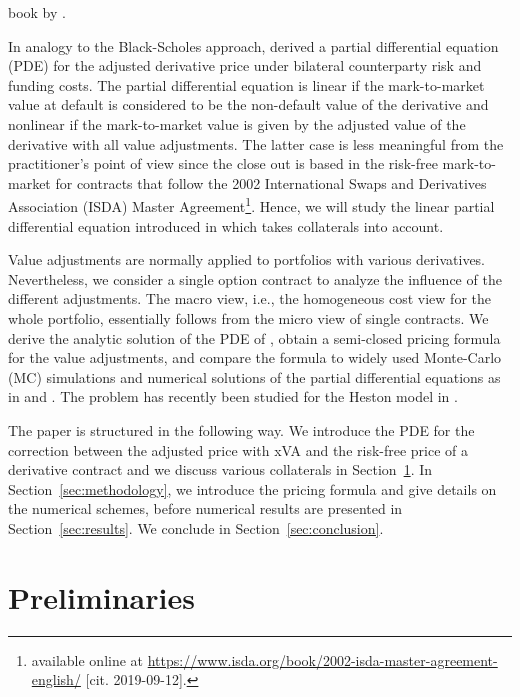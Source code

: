 \documentclass[a4paper,10pt]{article}
\newcommand{\1}{\mathbf{1}}
\begin{document}
book by \cite{Gregory2020}.

In analogy to the Black-Scholes approach, \cite{BurgardKjaer11PDE} derived a partial differential equation (PDE) for the adjusted derivative price under bilateral counterparty risk and funding costs. The partial differential equation is linear if the mark-to-market value at default is considered to be the non-default value of the derivative and nonlinear if the mark-to-market value is given by the adjusted value of the derivative with all value adjustments. The latter case is less meaningful from the practitioner's point of view since the close out is based in the risk-free mark-to-market for contracts that follow the 2002 International Swaps and Derivatives Association (ISDA) Master Agreement\footnote{available online at \url{https://www.isda.org/book/2002-isda-master-agreement-english/} [cit. 2019-09-12].}. Hence, we will study the linear partial differential equation introduced in \cite{BurgardKjaer13} which takes collaterals into account.

Value adjustments are normally applied to portfolios with various derivatives. Nevertheless, we consider a single option contract to analyze the influence of the different adjustments. The macro view, i.e., the homogeneous cost view for the whole portfolio, essentially follows from the micro view of single contracts. We derive the analytic solution of the PDE of \cite{BurgardKjaer13}, obtain a semi-closed pricing formula for the value adjustments, and compare the formula to widely used Monte-Carlo (MC) simulations and numerical solutions of the partial differential equations as in \cite{Arregui17} and \cite{Arregui18}. The problem has recently been studied for the Heston model in \cite{SalvadorOosterlee21}.

The paper is structured in the following way. We introduce the PDE for the correction between the adjusted price with xVA and the risk-free price of a derivative contract and we discuss various collaterals in Section~\ref{sec:preliminaries}. In Section~\ref{sec:methodology}, we introduce the pricing formula and give details on the numerical schemes, before numerical results are presented in Section~\ref{sec:results}. We conclude in Section~\ref{sec:conclusion}.

\section{Preliminaries}\label{sec:preliminaries}
\end{document}
